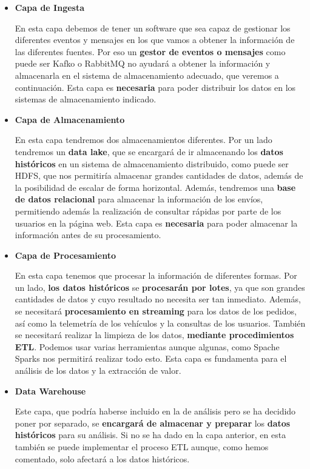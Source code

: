 \begin{itemize}
	\item \textbf{Capa de Ingesta} 
	
	En esta capa debemos de tener un software que sea capaz de gestionar los diferentes eventos y mensajes en los que vamos a obtener la información de las diferentes fuentes. Por eso un \textbf{gestor de eventos o mensajes} como puede ser Kafko o RabbitMQ no ayudará a obtener la información y almacenarla en el sistema de almacenamiento adecuado, que veremos a continuación. Esta capa es \textbf{necesaria} para poder distribuir los datos en los sistemas de almacenamiento indicado.
	
	\item \textbf{Capa de Almacenamiento}        
	
	En esta capa tendremos dos almacenamientos diferentes. Por un lado tendremos un \textbf{data lake}, que se encargará de ir almacenando los \textbf{datos históricos} en un sistema de almacenamiento distribuido, como puede ser HDFS, que nos permitiría almacenar grandes cantidades de datos, además de la posibilidad de escalar de forma horizontal. Además, tendremos una \textbf{base de datos relacional} para almacenar la información de los envíos, permitiendo además la realización de consultar rápidas por parte de los usuarios en la página web. Esta capa es \textbf{necesaria} para poder almacenar la información antes de su procesamiento.
	
	\item \textbf{Capa de Procesamiento}   
	
	En esta capa tenemos que procesar la información de diferentes formas. Por un lado, \textbf{los datos históricos} se \textbf{procesarán por lotes}, ya que son grandes cantidades de datos y cuyo resultado no necesita ser tan inmediato. Además, se necesitará \textbf{procesamiento en streaming} para los datos de los pedidos, así como la telemetría de los vehículos y la consultas de los usuarios. También se necesitará realizar la limpieza de los datos, \textbf{mediante procedimientos ETL}.  Podemos usar varias herramientas aunque algunas, como Spache Sparks nos permitirá realizar todo esto. Esta capa es fundamenta para el análisis de los datos y la extracción de valor.
	
	\item \textbf{Data Warehouse}
	
	Este capa, que podría haberse incluido en la de análisis pero se ha decidido poner por separado, se \textbf{encargará de almacenar y preparar} los \textbf{datos históricos} para su análisis. Si no se ha dado en la capa anterior, en esta también se puede implementar el proceso ETL aunque, como hemos comentado, solo afectará a los datos históricos.
	

\end{itemize}
